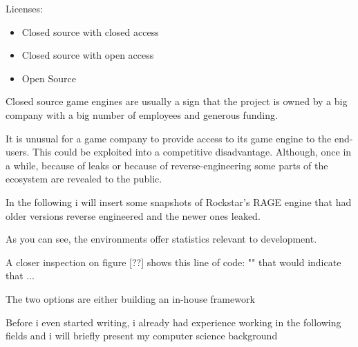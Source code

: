 


        Licenses:

        \begin{itemize}
            \item Closed source with closed access
            \item Closed source with open access
            \item Open Source
        \end{itemize}

        Closed source game engines are usually a sign that the project is owned by a big company with a big number of employees and generous funding.
        
        It is unusual for a game company to provide access to its game engine to the end-users. This could be exploited into a competitive disadvantage.
        Although, once in a while, because of leaks or because of reverse-engineering some parts of the ecosystem are revealed to the public.

        In the following i will insert some snapshots of Rockstar's RAGE engine that had older versions reverse engineered and the newer ones leaked. 
        

        As you can see, the environments offer statistics relevant to development.

        A closer inspection on figure [??] shows this line of code: "" that would indicate that ...



        The two options are either building an in-house framework 

        Before i even started writing, i already had experience working in the following fields and i will briefly present my computer science background



